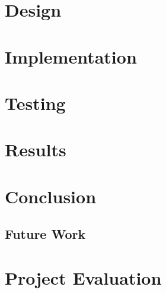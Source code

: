 \documentclass[12pt]{article}
\begin{document}
\section{Design}\label{design}
\section{Implementation}\label{implementation}
\section{Testing}\label{teting}
\section{Results}\label{results}
\section{Conclusion}\label{conclusion}
\subsection{Future Work}\label{future}
\section{Project Evaluation}\label{evaluation}



\end{document}
